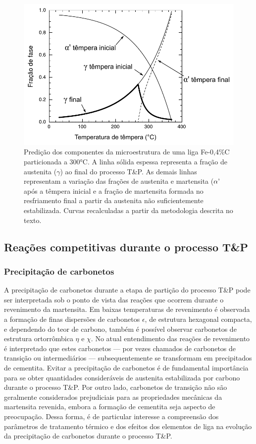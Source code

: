 \begin{figure}
	\includegraphics[width=13cm]{img/TPprevisto.pdf}
	\caption{Predição dos componentes da microestrutura de uma liga Fe-0,4\%C particionada a 300°C. A linha sólida espessa representa a fração de austenita ($\gamma$) ao final do processo T\&P. As demais linhas representam a variação das frações de austenita e martensita ($\alpha\text{\textquoteright}$ após a têmpera inicial e a fração de martensita formada no resfriamento final a partir da austenita não suficientemente estabilizada. Curvas recalculadas a partir da metodologia descrita no texto.}
	\label{fig:TPprevisto}
\end{figure}

\subsection{Rea\c{c}\~{o}es competitivas durante o processo T\&P}

\subsubsection{Precipitação de carbonetos}

A precipitação de carbonetos durante a etapa de partição do processo T\&P pode ser interpretada sob o ponto de vista das reações que ocorrem durante o revenimento da martensita. Em baixas temperaturas de revenimento é observada a formação de finas dispersões de carbonetos $\epsilon$, de estrutura hexagonal compacta, e dependendo do teor de carbono, também é possível observar carbonetos de estrutura ortorrômbica $\eta$ e $\chi$. No atual entendimento das reações de revenimento é interpretado que estes carbonetos --- por vezes chamados de carbonetos de transição ou intermediários --- subsequentemente se transformam em precipitados de cementita\cite{Speich1972}. Evitar a precipitação de carbonetos é de fundamental importância para se obter quantidades consideráveis de austenita estabilizada por carbono durante o processo T\&P. Por outro lado, carbonetos de transição não são geralmente considerados prejudiciais para as propriedades mecânicas da martensita revenida, embora a formação de cementita seja aspecto de preocupação\cite{Krauss1983}. Dessa forma, é de particular interesse a compreensão dos parâmetros de tratamento térmico e dos efeitos dos elementos de liga na evolução da precipitação de carbonetos durante o processo T\&P. 

